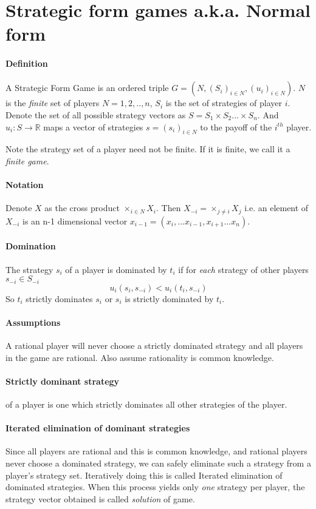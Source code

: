 \section{Strategic form games a.k.a. Normal form}
\paragraph{Definition} A Strategic Form Game is an ordered triple $G = (N, (S_i)_{i \in N}, (u_i)_{i \in N})$. $N$ is the \textit{finite} set of players $N = {1,2,..,n}$, $S_i$ is the set of strategies of player $i$. Denote the set of all possible strategy vectors as $S = S_1 \times S_2 ... \times S_n$. And $u_i: S \to \mathbb{R}$ maps a vector of strategies $s = (s_i)_{i \in N}$ to the payoff of the $i^{th}$ player. 

Note the strategy set of a player need not be finite. If it is finite, we call it a \textit{finite game}.

\paragraph{Notation} Denote $X$ as the cross product $\times_{i \in N}X_i$. Then $X_{-i} = \times_{j\neq i}X_j$ i.e. an element of $X_{-i}$ is an n-1 dimensional vector $x_{i-1} = (x_i, ... x_{i-1}, x_{i+1}... x_n)$.

\paragraph{Domination} The strategy $s_i$ of a player is dominated by $t_i$ if for \textit{each} strategy of other players $s_{-i} \in S_{-i}$ 
\[
    u_i(s_i, s_{-i}) < u_i(t_i, s_{-i})
\]
So $t_i$ strictly dominates $s_i$ or $s_i$ is strictly dominated by $t_i$.

\paragraph{Assumptions} A rational player will never choose a strictly dominated strategy and all players in the game are rational. Also assume rationality is common knowledge.

\paragraph{Strictly dominant strategy} of a player is one which strictly dominates all other strategies of the player.

\paragraph{Iterated elimination of dominant strategies} Since all players are rational and this is common knowledge, and rational players never choose a dominated strategy, we can safely eliminate such a strategy from a player's strategy set. Iteratively doing this is called Iterated elimination of dominated strategies. When this process yields only \textit{one} strategy per player, the strategy vector obtained is called \textit{solution} of game.

